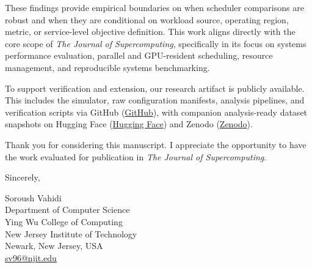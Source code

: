 \documentclass[10pt]{article}
\begin{document}
These findings provide empirical boundaries on when scheduler comparisons are robust and when they are conditional on workload source, operating region, metric, or service-level objective definition. This work aligns directly with the core scope of \textit{The Journal of Supercomputing}, specifically in its focus on systems performance evaluation, parallel and GPU-resident scheduling, resource management, and reproducible systems benchmarking.

To support verification and extension, our research artifact is publicly available. This includes the simulator, raw configuration manifests, analysis pipelines, and verification scripts via GitHub (\href{https://github.com/SoroushVahidi/llm-serving-scheduler-robustness-benchmark}{GitHub}), with companion analysis-ready dataset snapshots on Hugging Face (\href{https://huggingface.co/datasets/SoroushVahidi/llm-serving-scheduler-portability}{Hugging Face}) and Zenodo (\href{https://doi.org/10.5281/zenodo.22306798}{Zenodo}).

Thank you for considering this manuscript. I appreciate the opportunity to have the work evaluated for publication in \textit{The Journal of Supercomputing}.

\vspace{0.4cm}

Sincerely,

\vspace{0.4cm}

Soroush Vahidi\\
Department of Computer Science\\
Ying Wu College of Computing\\
New Jersey Institute of Technology\\
Newark, New Jersey, USA\\
\href{mailto:sv96@njit.edu}{sv96@njit.edu}
\end{document}
